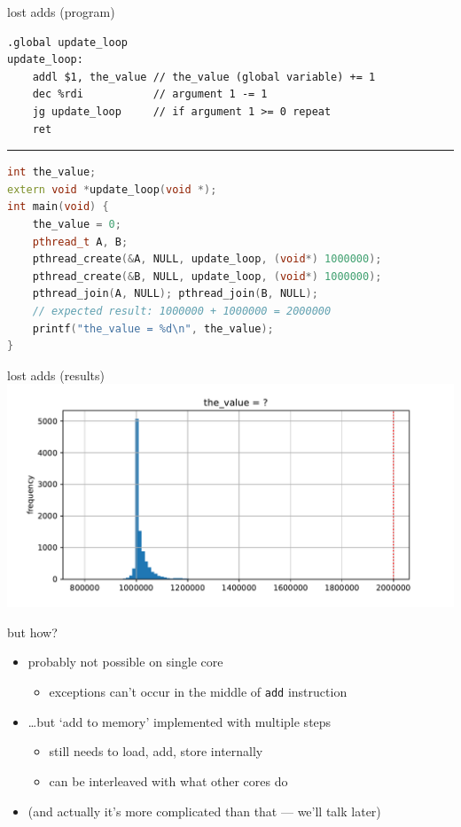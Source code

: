 
\begin{frame}[fragile,label=lostAdds]{lost adds (program)}
\begin{lstlisting}[language=myasm,style=smaller]
.global update_loop
update_loop:
    addl $1, the_value // the_value (global variable) += 1
    dec %rdi           // argument 1 -= 1
    jg update_loop     // if argument 1 >= 0 repeat
    ret
\end{lstlisting}
\hrule
\begin{lstlisting}[language=C++,style=smaller]
int the_value;
extern void *update_loop(void *);
int main(void) {
    the_value = 0;
    pthread_t A, B;
    pthread_create(&A, NULL, update_loop, (void*) 1000000);
    pthread_create(&B, NULL, update_loop, (void*) 1000000);
    pthread_join(A, NULL); pthread_join(B, NULL);
    // expected result: 1000000 + 1000000 = 2000000
    printf("the_value = %d\n", the_value);
}
\end{lstlisting}
\end{frame}

\begin{frame}[fragile,label=lostAddsResult]{lost adds (results)}
\includegraphics[width=1.1\textwidth]{../sync/parallel-add-histogram}
\end{frame}

\begin{frame}{but how?}
    \begin{itemize}
    \item probably not possible on single core
        \begin{itemize}
            \item exceptions can't occur in the middle of \texttt{add} instruction
        \end{itemize}
    \item \ldots but `add to memory' implemented with multiple steps
        \begin{itemize}
        \item still needs to load, add, store internally
        \item can be interleaved with what other cores do
        \end{itemize}
        \vspace{.5cm}
    \item<2-> {\small (and actually it's more complicated than that --- we'll talk later)}
    \end{itemize}
\end{frame}

